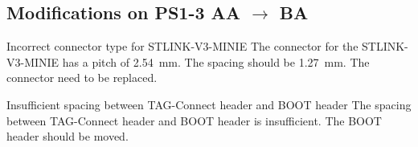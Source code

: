 \FloatBarrier

\subsection{Modifications on PS1-3 AA $\to$ BA}

\begin{ModTable}

\ModItemOpen
{Incorrect connector type for STLINK-V3-MINIE}
{The connector for the STLINK-V3-MINIE has a pitch of \qty{2.54}{\milli\meter}. The spacing should be \qty{1.27}{\milli\meter}. }
{The connector need to be replaced. }
{}
{}

\ModItemOpen
{Insufficient spacing between TAG-Connect header and BOOT header}
{The spacing between TAG-Connect header and BOOT header is insufficient. }
{The BOOT header should be moved. }
{}
{}

\end{ModTable}

\FloatBarrier

